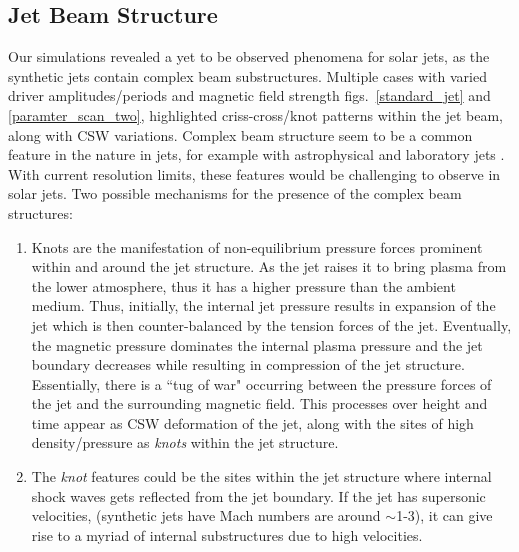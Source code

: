 \documentclass[12pt]{ociamthesis}
\begin{document}
\subsection{Jet Beam Structure}
\label{subsec:j_beam_struc}
Our simulations revealed a yet to be observed phenomena for solar jets, as the synthetic jets contain complex beam substructures. Multiple cases with varied driver amplitudes/periods and magnetic field strength figs.~\ref{standard_jet} and \ref{paramter_scan_two}, highlighted criss-cross/knot patterns within the jet beam, along with CSW variations. Complex beam structure seem to be a common feature in the nature in jets, for example with astrophysical \citep{van_Putten_1996ApJ467L57V, DeGouveiaDalPino2005, Hada2013ApJ77570H, Cohen2014ApJ787151C, Hervet2017AnA606A103H} and laboratory jets \citep{Menon2010, Edgington-Mitchell2014, Ono2014}. With current resolution limits, these features would be challenging to observe in solar jets. Two possible mechanisms for the presence of the complex beam structures:
\begin{enumerate}
\item{Knots are the manifestation of non-equilibrium pressure forces prominent within and around the jet structure. As the jet raises it to bring plasma from the lower atmosphere, thus it has a higher pressure than the ambient medium. Thus, initially, the internal jet pressure results in expansion of the jet which is then counter-balanced by the tension forces of the jet. Eventually, the magnetic pressure dominates the internal plasma pressure and the jet boundary decreases while resulting in compression of the jet structure. Essentially, there is a ``tug of war" occurring between the pressure forces of the jet and the surrounding magnetic field. This processes over height and time appear as CSW deformation of the jet, along with the sites of high density/pressure as \textit{knots} within the jet structure.}
\item{The \textit{knot} features could be the sites within the jet structure where internal shock waves \citep{Norman1982} gets reflected from the jet boundary. If the jet has supersonic velocities,  (synthetic jets have Mach numbers are around $\sim$1-3), it can give rise to a myriad of internal substructures due to high velocities.}
\end{enumerate}
\end{document}

